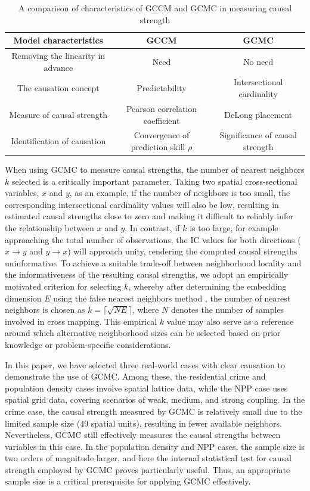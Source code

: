 \documentclass[authoryear,preprint,review,12pt]{elsarticle}
\begin{document}
\begin{table}[htb]
\centering
\caption{A comparison of characteristics of GCCM and GCMC in measuring causal strength}
\label{tbl_diff}
{\scriptsize
\begin{tabular}{|c|c|c|}
\hline
\textbf{Model characteristics} & \textbf{GCCM} & \textbf{GCMC} \\
\hline
Removing the linearity in advance & Need & No need \\
\hline
The causation concept & Predictability & Intersectional cardinality \\
\hline
Measure of causal strength & Pearson correlation coefficient & DeLong placement \\ 
\hline
Identification of causation & Convergence of prediction skill \(\rho\) & Significance of causal strength \\
\hline
\end{tabular}
}
\end{table}

When using GCMC to measure causal strengths, the number of nearest neighbors $k$ selected is a critically important parameter. Taking two spatial cross-sectional variables, $x$ and $y$, as an example, if the number of neighbors is too small, the corresponding intersectional cardinality values will also be low, resulting in estimated causal strengths close to zero and making it difficult to reliably infer the relationship between $x$ and $y$. In contrast, if $k$ is too large, for example approaching the total number of observations, the IC values for both directions ($x \to y$ and $y \to x$) will approach unity, rendering the computed causal strengths uninformative. To achieve a suitable trade-off between neighborhood locality and the informativeness of the resulting causal strengths, we adopt an empirically motivated criterion for selecting $k$, whereby after determining the embedding dimension $E$ using the false nearest neighbors method \citep{kennel1992fnn}, the number of nearest neighbors is chosen as $k = \lceil \sqrt{N E} \rceil$, where $N$ denotes the number of samples involved in cross mapping. This empirical $k$ value may also serve as a reference around which alternative neighborhood sizes can be selected based on prior knowledge or problem-specific considerations.

In this paper, we have selected three real-world cases with clear causation to demonstrate the use of GCMC. Among these, the residential crime and population density cases involve spatial lattice data, while the NPP case uses spatial grid data, covering scenarios of weak, medium, and strong coupling. In the crime case, the causal strength measured by GCMC is relatively small due to the limited sample size (49 spatial units), resulting in fewer available neighbors. Nevertheless, GCMC still effectively measures the causal strengths between variables in this case. In the population density and NPP cases, the sample size is two orders of magnitude larger, and here the internal statistical test for causal strength employed by GCMC proves particularly useful. Thus, an appropriate sample size is a critical prerequisite for applying GCMC effectively.
\end{document}
